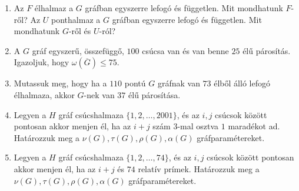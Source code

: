 \documentclass[a4paper, 12pt]{article}
\begin{document}
\begin{enumerate}
\item Az $F$ élhalmaz a $G$ gráfban egyszerre lefogó és független. Mit mondhatunk $F$-ről? Az $U$ ponthalmaz a $G$ gráfban egyszerre lefogó és független. Mit mondhatunk $G$-ről és $U$-ról?


\item A $G$ gráf egyszerű, összefüggő, $100$ csúcsa van és van benne $25$ élű párosítás. Igazoljuk, hogy $\omega(\overline G)\le 75$.


\item Mutassuk meg, hogy ha a $110$ pontú $G$ gráfnak van $73$ élből álló lefogó élhalmaza, akkor $G$-nek van $37$ élű párosítása.


\item Legyen a $H$ gráf csúcshalmaza $\{1,2,\ldots,2001\}$, és az $i,j$ csúcsok között pontosan akkor menjen él, ha az $i+j$ szám $3$-mal osztva $1$ maradékot ad. Határozzuk meg a $\nu(G), \tau(G),\rho(G),\alpha(G)$ gráfparamétereket.%


\item Legyen a $H$ gráf csúcshalmaza $\{1,2,\ldots,74\}$, és az $i,j$ csúcsok között pontosan akkor menjen él, ha az $i+j$ és $74$ relatív prímek. Határozzuk meg a $\nu(G), \tau(G),\rho(G),\alpha(G)$ gráfparamétereket.%




\end{enumerate}
\end{document}

